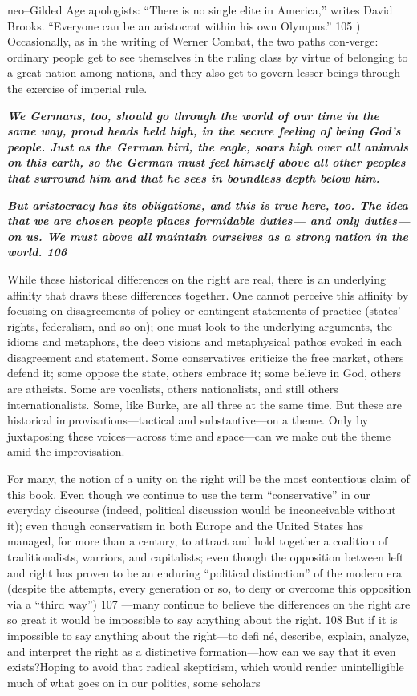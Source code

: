 neo–Gilded Age apologists: “There is no single elite in America,” writes David Brooks. “Everyone can be an aristocrat within his own Olympus.” {\color{blue} 105 }) Occasionally, as in the writing of Werner Combat, the two paths con-verge: ordinary people get to see themselves in the ruling class by virtue of belonging to a great nation among nations, and they also get to govern lesser beings through the exercise of imperial rule.{\par} {\textbf{\textit{We Germans, too, should go through the world of our time in the same way, proud heads held high, in the secure feeling of being God’s people. Just as the German bird, the eagle, soars high over all animals on this earth, so the German must feel himself above all other peoples that surround him and that he sees in boundless depth below him.} } }{\par} {\par} {\textbf{\textit{But aristocracy has its obligations, and this is true here, too. The idea that we are chosen people places formidable duties— and only duties—on us. We must above all maintain ourselves as a strong nation in the world. {\color{blue} 106 } } } }{\par} While these historical differences on the right are real, there is an underlying affinity that draws these differences together. One cannot perceive this affinity by focusing on disagreements of policy or contingent statements of practice (states’ rights, federalism, and so on); one must look to the underlying arguments, the idioms and metaphors, the deep visions and metaphysical pathos evoked in each disagreement and statement. Some conservatives criticize the free market, others defend it; some oppose the state, others embrace it; some believe in God, others are atheists. Some are vocalists, others nationalists, and still others internationalists. Some, like Burke, are all three at the same time. But these are historical improvisations—tactical and substantive—on a theme. Only by juxtaposing these voices—across time and space—can we make out the theme amid the improvisation.{\par} For many, the notion of a unity on the right will be the most contentious claim of this book. Even though we continue to use the term “conservative” in our everyday discourse (indeed, political discussion would be inconceivable without it); even though conservatism in both Europe and the United States has managed, for more than a century, to attract and hold together a coalition of traditionalists, warriors, and capitalists; even though the opposition between left and right has proven to be an enduring “political distinction” of the modern era (despite the attempts, every generation or so, to deny or overcome this opposition via a “third way”) {\color{blue} 107 } —many continue to believe the differences on the right are so great it would be impossible to say anything about the right. {\color{blue} 108 } But if it is impossible to say anything about the right—to defi né, describe, explain, analyze, and interpret the right as a distinctive formation—how can we say that it even exists?Hoping to avoid that radical skepticism, which would render unintelligible much of what goes on in our politics, some scholars 